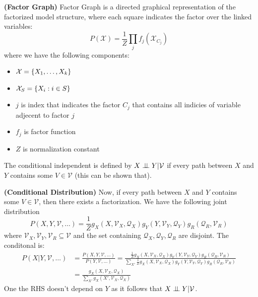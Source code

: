 \begin{definition}{\textbf{(Factor Graph)}}
    Factor Graph is a directed graphical representation of the factorized model structure, where each square indicates the factor over the linked variables:
    \begin{equation*}
        P(\mathcal{X}) = \frac{1}{Z}\prod_j f_j(\mathcal{X}_{C_j})
    \end{equation*} 
    where we have the following components:
    \begin{itemize}
        \item $\mathcal{X} = \left\{ X_1,\dots,X_k \right\}$
        \item $\mathcal{X}_S = \left\{ X_i : i \in S \right\}$
        \item $j$ is index that indicates the factor $C_j$ that contains all indicies of variable adjecent to factor $j$
        \item $f_j$ is factor function
        \item $Z$ is normalization constant
    \end{itemize}
    The conditional independent is defined by $X\perp \!\!\! \perp Y | \mathcal{V}$ if every path between $X$ and $Y$ contains some $V\in\mathcal{V}$ (this can be shown that).
\end{definition}

\begin{remark}{\textbf{(Conditional Distribution)}}
    Now, if every path between $X$ and $Y$ contains some $V \in \mathcal{V}$, then there exists a factorization. We have the following joint distribution
    \begin{equation*}
        P(X, Y, \mathcal{V},\dots) = \frac{1}{Z}g_X(X,\mathcal{V}_X,\mathcal{Q}_X) g_Y(Y, \mathcal{V}_Y, \mathcal{Q}_Y)g_R(\mathcal{Q}_R,\mathcal{V}_R)
    \end{equation*}
    where $\mathcal{V}_X,\mathcal{V}_Y,\mathcal{V}_R\subseteq\mathcal{V}$ and the set containing $\mathcal{Q}_X, \mathcal{Q}_Y, \mathcal{Q}_R$ are disjoint. The conditonal is:
    \begin{equation*}
    \begin{aligned}
        P(X|Y, \mathcal{V},\dots) &= \frac{P(X, Y, \mathcal{V},\dots)}{P(Y, \mathcal{V},\dots)} = \frac{\frac{1}{Z}g_X(X,\mathcal{V}_X,\mathcal{Q}_X) g_Y(Y, \mathcal{V}_Y, \mathcal{Q}_Y)g_R(\mathcal{Q}_R,\mathcal{V}_R)}{\sum_{X'}\frac{1}{Z}g_X(X,\mathcal{V}_X,\mathcal{Q}_X) g_Y(Y, \mathcal{V}_Y, \mathcal{Q}_Y)g_R(\mathcal{Q}_R,\mathcal{V}_R)} \\
        &= \frac{g_X(X,\mathcal{V}_X,\mathcal{Q}_X)}{\sum_{X'}g_X(X',\mathcal{V}_X,\mathcal{Q}_X)}
    \end{aligned}
    \end{equation*}
    One the RHS doesn't depend on $Y$ as it follows that $X\perp \!\!\! \perp Y | \mathcal{V}$. 
\end{remark}

